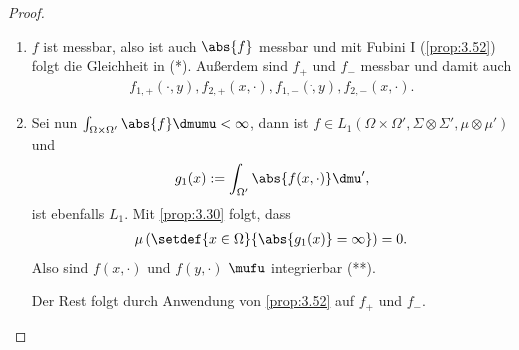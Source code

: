 \begin{proof}
\begin{enumerate}[label=\arabic{*}.)]
  \item $f$ ist messbar, also ist auch $\abs{f}$ messbar und mit 
  Fubini I (\ref{prop:3.52}) folgt 
  die Gleichheit in (*). Außerdem sind $f_+$ und $f_-$ messbar und damit auch
\begin{align*}
f_{1,+}(\cdot,y), f_{2,+}(x,\cdot), f_{1,-}(\dot,y), f_{2,-}(x,\cdot). 
\end{align*}
\item Sei nun $\int_{\Omega\times\Omega'} \abs{f}\dmumu<\infty$, dann ist
$f\in L_1(\Omega\times\Omega',\Sigma\otimes\Sigma',\mu\otimes\mu')$ und
\begin{align*}
g_1(x) := \int_{\Omega'} \abs{f(x,\cdot)} \dmu',
\end{align*}
ist ebenfalls $L_1$. Mit \ref{prop:3.30} folgt, dass
\begin{align*}
\mu\left(\setdef{x\in\Omega}{\abs{g_1(x)} = \infty}\right) = 0.
\end{align*}
Also sind $f(x,\cdot)$ und $f(y,\cdot)$ $\mufu$ integrierbar (**).

Der Rest folgt durch Anwendung von \ref{prop:3.52} auf $f_+$ und $f_-$.\qedhere 
\end{enumerate}
\end{proof}


